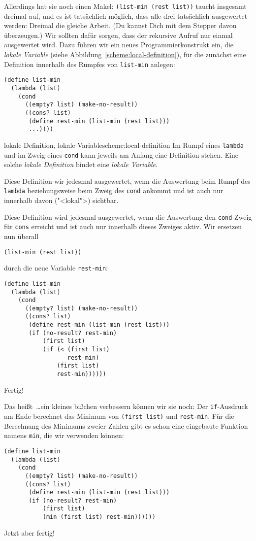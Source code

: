 Allerdings hat sie noch einen Makel: \lstinline{(list-min (rest list))}
taucht insgesamt dreimal auf, und es ist tatsächlich
möglich, dass alle drei tatsächlich ausgewertet werden: Dreimal die
gleiche Arbeit.  (Du kannst Dich mit dem Stepper davon überzeugen.)
Wir sollten dafür sorgen, dass der rekursive Aufruf nur einmal
ausgewertet wird.  Dazu führen wir ein neues Programmierkonstrukt ein,
die \textit{lokale Variable} (siehe Abbildung~\ref{scheme:local-definition}), für die zunächst
eine Definition innerhalb des Rumpfes von \lstinline{list-min} anlegen:
%
\begin{lstlisting}
(define list-min
  (lambda (list)
    (cond
      ((empty? list) (make-no-result))
      ((cons? list)
       (define rest-min (list-min (rest list)))
       ...))))
\end{lstlisting}
%
\begin{feature}{lokale Definition, lokale Variable}{scheme:local-definition}
  Im Rumpf eines \lstinline{lambda} und im Zweig eines
  \lstinline{cond} kann jeweils am Anfang eine Definition stehen.
  Eine solche \textit{lokale Definition}
  bindet eine \textit{lokale Variable}.

  Diese Definition wir jedesmal ausgewertet, wenn die Auswertung beim
  Rumpf des \lstinline{lambda} beziehungsweise beim Zweig des
  \lstinline{cond} ankommt und ist auch nur innerhalb davon
  ("<lokal">) sichtbar.
\end{feature}
%
Diese Definition wird jedesmal ausgewertet, wenn die Auswertung den
\lstinline{cond}-Zweig für \lstinline{cons} erreicht und ist auch nur
innerhalb dieses Zweiges aktiv.  Wir ersetzen nun überall
%
\begin{lstlisting}
(list-min (rest list))
\end{lstlisting}
durch die neue Variable
\lstinline{rest-min}:
%
\begin{lstlisting}
(define list-min
  (lambda (list)
    (cond
      ((empty? list) (make-no-result))
      ((cons? list)
       (define rest-min (list-min (rest list)))
       (if (no-result? rest-min)
           (first list)
           (if (< (first list)
                  rest-min)
               (first list)
               rest-min))))))
\end{lstlisting}
%
Fertig!

Das heißt~\ldots ein kleines bißchen verbessern können wir sie noch:
Der \lstinline{if}-Ausdruck am Ende berechnet das Minimum von
\lstinline{(first list)} und \lstinline{rest-min}.  Für die Berechnung
des Minimums zweier Zahlen gibt es schon eine eingebaute Funktion
namens \lstinline{min}, die wir verwenden können:
%
\begin{lstlisting}
(define list-min
  (lambda (list)
    (cond
      ((empty? list) (make-no-result))
      ((cons? list)
       (define rest-min (list-min (rest list)))
       (if (no-result? rest-min)
           (first list)
           (min (first list) rest-min))))))
\end{lstlisting}
%
Jetzt aber fertig!

